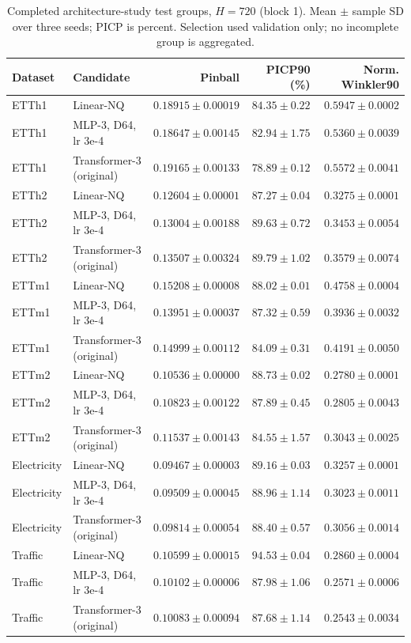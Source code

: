 \begin{table}[t]
\centering\small
\caption{Completed architecture-study test groups, $H=720$ (block 1). Mean $\pm$ sample SD over three seeds; PICP is percent. Selection used validation only; no incomplete group is aggregated.}
\label{tab:architecture-test-720-0}
\begin{tabular}{@{}llrrr@{}}
\toprule
Dataset & Candidate & Pinball & PICP90 (\%) & Norm. Winkler90 \\
\midrule
ETTh1 & Linear-NQ & $0.18915\pm0.00019$ & $84.35\pm0.22$ & $0.5947\pm0.0002$ \\
ETTh1 & MLP-3, D64, lr 3e-4 & $0.18647\pm0.00145$ & $82.94\pm1.75$ & $0.5360\pm0.0039$ \\
ETTh1 & Transformer-3 (original) & $0.19165\pm0.00133$ & $78.89\pm0.12$ & $0.5572\pm0.0041$ \\
ETTh2 & Linear-NQ & $0.12604\pm0.00001$ & $87.27\pm0.04$ & $0.3275\pm0.0001$ \\
ETTh2 & MLP-3, D64, lr 3e-4 & $0.13004\pm0.00188$ & $89.63\pm0.72$ & $0.3453\pm0.0054$ \\
ETTh2 & Transformer-3 (original) & $0.13507\pm0.00324$ & $89.79\pm1.02$ & $0.3579\pm0.0074$ \\
ETTm1 & Linear-NQ & $0.15208\pm0.00008$ & $88.02\pm0.01$ & $0.4758\pm0.0004$ \\
ETTm1 & MLP-3, D64, lr 3e-4 & $0.13951\pm0.00037$ & $87.32\pm0.59$ & $0.3936\pm0.0032$ \\
ETTm1 & Transformer-3 (original) & $0.14999\pm0.00112$ & $84.09\pm0.31$ & $0.4191\pm0.0050$ \\
ETTm2 & Linear-NQ & $0.10536\pm0.00000$ & $88.73\pm0.02$ & $0.2780\pm0.0001$ \\
ETTm2 & MLP-3, D64, lr 3e-4 & $0.10823\pm0.00122$ & $87.89\pm0.45$ & $0.2805\pm0.0043$ \\
ETTm2 & Transformer-3 (original) & $0.11537\pm0.00143$ & $84.55\pm1.57$ & $0.3043\pm0.0025$ \\
Electricity & Linear-NQ & $0.09467\pm0.00003$ & $89.16\pm0.03$ & $0.3257\pm0.0001$ \\
Electricity & MLP-3, D64, lr 3e-4 & $0.09509\pm0.00045$ & $88.96\pm1.14$ & $0.3023\pm0.0011$ \\
Electricity & Transformer-3 (original) & $0.09814\pm0.00054$ & $88.40\pm0.57$ & $0.3056\pm0.0014$ \\
Traffic & Linear-NQ & $0.10599\pm0.00015$ & $94.53\pm0.04$ & $0.2860\pm0.0004$ \\
Traffic & MLP-3, D64, lr 3e-4 & $0.10102\pm0.00006$ & $87.98\pm1.06$ & $0.2571\pm0.0006$ \\
Traffic & Transformer-3 (original) & $0.10083\pm0.00094$ & $87.68\pm1.14$ & $0.2543\pm0.0034$ \\
\bottomrule
\end{tabular}
\end{table}


